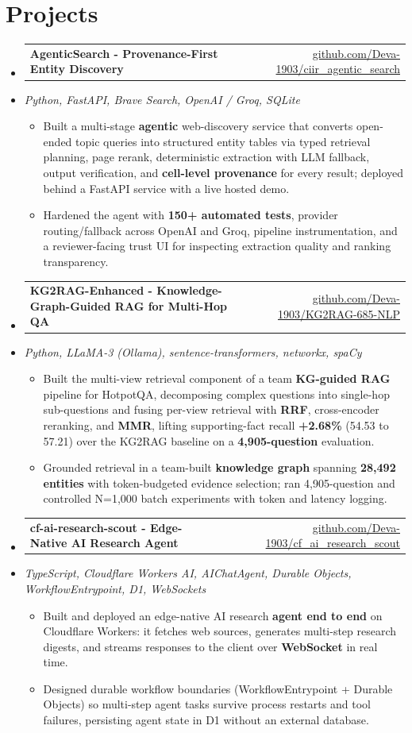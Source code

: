 \documentclass[letterpaper,10pt]{article}
\makeatletter
\newcommand{\resumeItem}[1]{
  \item\small{#1\vspace{-1pt}}
}
\newcommand{\resumeProjectHeading}[2]{
    \item
    \begin{tabular*}{0.985\textwidth}[t]{l@{\extracolsep{\fill}}r}
      \small\textbf{#1} & \small #2 \\
    \end{tabular*}\vspace{-5pt}
}
\newcommand{\resumeProjectSubheading}[1]{
  \vspace{-2pt}\item[] {\small\textcolor{ResumeSlate}{\emph{#1}}}\vspace{-3pt}
}
\newcommand{\resumeSubHeadingListStart}{\begin{itemize}[leftmargin=0.0in, label={}, itemsep=2pt, topsep=2pt]}
\newcommand{\resumeSubHeadingListEnd}{\end{itemize}}
\newcommand{\resumeItemListStart}{\begin{itemize}[leftmargin=0.18in, itemsep=2pt, topsep=1pt]}
\newcommand{\resumeItemListEnd}{\end{itemize}\vspace{-4pt}}
\makeatother
\begin{document}
\section{Projects}
\resumeSubHeadingListStart
  \resumeProjectHeading
    {AgenticSearch - Provenance-First Entity Discovery}
    {\href{https://github.com/Deva-1903/ciir_agentic_search}{github.com/Deva-1903/ciir\_agentic\_search}}
  \resumeProjectSubheading{Python, FastAPI, Brave Search, OpenAI / Groq, SQLite}
    \resumeItemListStart
      \resumeItem{Built a multi-stage \textbf{agentic} web-discovery service that converts open-ended topic queries into structured entity tables via typed retrieval planning, page rerank, deterministic extraction with LLM fallback, output verification, and \textbf{cell-level provenance} for every result; deployed behind a FastAPI service with a live hosted demo.}
      \resumeItem{Hardened the agent with \textbf{150+ automated tests}, provider routing/fallback across OpenAI and Groq, pipeline instrumentation, and a reviewer-facing trust UI for inspecting extraction quality and ranking transparency.}
    \resumeItemListEnd
  \resumeProjectHeading
    {KG2RAG-Enhanced - Knowledge-Graph-Guided RAG for Multi-Hop QA}
    {\href{https://github.com/Deva-1903/KG2RAG-685-NLP}{github.com/Deva-1903/KG2RAG-685-NLP}}
  \resumeProjectSubheading{Python, LLaMA-3 (Ollama), sentence-transformers, networkx, spaCy}
    \resumeItemListStart
      \resumeItem{Built the multi-view retrieval component of a team \textbf{KG-guided RAG} pipeline for HotpotQA, decomposing complex questions into single-hop sub-questions and fusing per-view retrieval with \textbf{RRF}, cross-encoder reranking, and \textbf{MMR}, lifting supporting-fact recall \textbf{+2.68\%} (54.53 to 57.21) over the KG2RAG baseline on a \textbf{4,905-question} evaluation.}
      \resumeItem{Grounded retrieval in a team-built \textbf{knowledge graph} spanning \textbf{28,492 entities} with token-budgeted evidence selection; ran 4,905-question and controlled N=1,000 batch experiments with token and latency logging.}
    \resumeItemListEnd
  \resumeProjectHeading
    {cf-ai-research-scout - Edge-Native AI Research Agent}
    {\href{https://github.com/Deva-1903/cf_ai_research_scout}{github.com/Deva-1903/cf\_ai\_research\_scout}}
  \resumeProjectSubheading{TypeScript, Cloudflare Workers AI, AIChatAgent, Durable Objects, WorkflowEntrypoint, D1, WebSockets}
    \resumeItemListStart
      \resumeItem{Built and deployed an edge-native AI research \textbf{agent end to end} on Cloudflare Workers: it fetches web sources, generates multi-step research digests, and streams responses to the client over \textbf{WebSocket} in real time.}
      \resumeItem{Designed durable workflow boundaries (WorkflowEntrypoint + Durable Objects) so multi-step agent tasks survive process restarts and tool failures, persisting agent state in D1 without an external database.}
    \resumeItemListEnd
\resumeSubHeadingListEnd
\vspace{-4pt}
\end{document}

